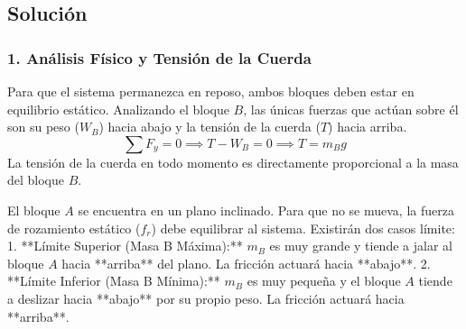 \documentclass[12pt, a4paper]{article}
\begin{document}
\begin{center}
\end{center}

\subsection*{Solución}

\subsubsection*{1. Análisis Físico y Tensión de la Cuerda}
Para que el sistema permanezca en reposo, ambos bloques deben estar en equilibrio estático.
Analizando el bloque $B$, las únicas fuerzas que actúan sobre él son su peso ($W_B$) hacia abajo y la tensión de la cuerda ($T$) hacia arriba.
$$ \sum F_y = 0 \implies T - W_B = 0 \implies T = m_B g $$
La tensión de la cuerda en todo momento es directamente proporcional a la masa del bloque $B$.

El bloque $A$ se encuentra en un plano inclinado. Para que no se mueva, la fuerza de rozamiento estático ($f_r$) debe equilibrar al sistema. Existirán dos casos límite:
1.  **Límite Superior (Masa B Máxima):** $m_B$ es muy grande y tiende a jalar al bloque $A$ hacia **arriba** del plano. La fricción actuará hacia **abajo**.
2.  **Límite Inferior (Masa B Mínima):** $m_B$ es muy pequeña y el bloque $A$ tiende a deslizar hacia **abajo** por su propio peso. La fricción actuará hacia **arriba**.
\end{document}

